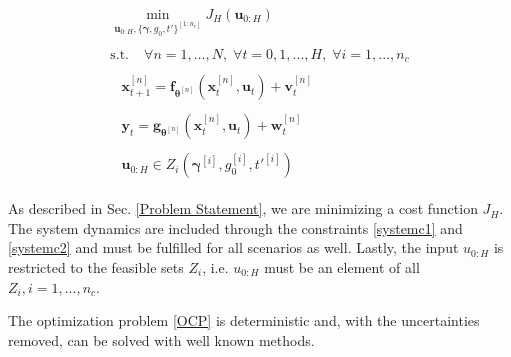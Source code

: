 \begin{subequations}
\begin{align}
\begin{split}
\min\limits_{\boldsymbol{u}_{0:H}, \{ \boldsymbol{\gamma}, g_0, t' \}^{[1:n_c]} }  J_H(\boldsymbol{u}_{0:H})
\end{split}\\
\begin{split}
\text{s.t.}\; &\forall n = 1,...,N, \;  \forall t = 0,1,...,H,\; \forall i = 1,...,n_c
\end{split}\\
\begin{split}\label{systemc1}
&\boldsymbol{x}_{t+1}^{[n]} = \boldsymbol{f}_{\boldsymbol{\theta}^{[n]}} \left( \boldsymbol{x}_{t}^{[n]} , \boldsymbol{u}_t \right) + \boldsymbol{v}_{t}^{[n]}
\end{split}\\
\begin{split}\label{systemc2}
&\boldsymbol{y}_{t} = \boldsymbol{g}_{\boldsymbol{\theta}^{[n]}} \left( \boldsymbol{x}_{t}^{[n]}, \boldsymbol{u}_t \right) + \boldsymbol{w}_{t}^{[n]}
\end{split}\\
\begin{split}
 &\boldsymbol{u}_{0:H} \in Z_i(\boldsymbol{\gamma}^{[i]}, g_0^{[i]}, t'^{[i]})
\end{split}
\end{align}
\label{OCP}
\end{subequations}

As described in Sec. \ref{Problem Statement}, we are minimizing a cost function $J_H$. The system dynamics are included through the constraints \ref{systemc1} and \ref{systemc2} and must be fulfilled for all scenarios as well. Lastly, the input $u_{0:H}$ is restricted to the feasible sets $Z_i$, i.e. $u_{0:H}$ must be an element of all $Z_i, i = 1,...,n_c$.

The optimization problem \ref{OCP} is deterministic and, with the uncertainties removed, can be solved with well known methods. 




